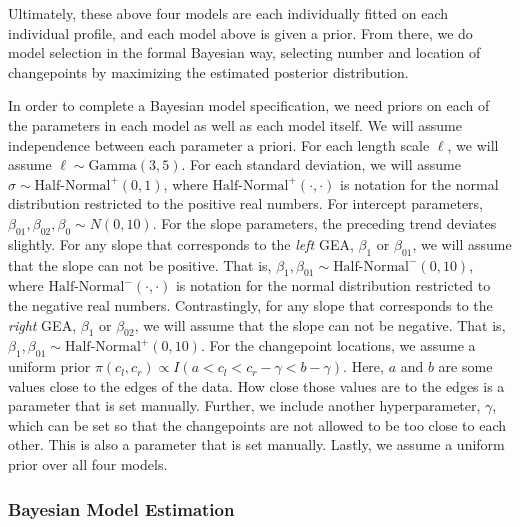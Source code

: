 \documentclass[12pt]{article}
\begin{document}
Ultimately, these above four models are each individually fitted on each
individual profile, and each model above is given a prior. From there,
we do model selection in the formal Bayesian way, selecting number and
location of changepoints by maximizing the estimated posterior
distribution.

In order to complete a Bayesian model specification, we need priors on
each of the parameters in each model as well as each model itself. We
will assume independence between each parameter a priori. For each
length scale \(\ell\), we will assume \(\ell \sim \text{Gamma}(3,5)\).
For each standard deviation, we will assume
\(\sigma \sim \text{Half-Normal}^{+}(0,1)\), where
\(\text{Half-Normal}^{+}(\cdot,\cdot)\) is notation for the normal
distribution restricted to the positive real numbers. For intercept
parameters, \(\beta_{01}, \beta_{02}, \beta_0 \sim N(0, 10)\). For the
slope parameters, the preceding trend deviates slightly. For any slope
that corresponds to the \emph{left} GEA, \(\beta_1\) or \(\beta_{01}\),
we will assume that the slope can not be positive. That is,
\(\beta_1, \beta_{01} \sim \text{Half-Normal}^{-}(0,10)\), where
\(\text{Half-Normal}^{-}(\cdot, \cdot)\) is notation for the normal
distribution restricted to the negative real numbers. Contrastingly, for
any slope that corresponds to the \emph{right} GEA, \(\beta_1\) or
\(\beta_{02}\), we will assume that the slope can not be negative. That
is, \(\beta_1, \beta_{01} \sim \text{Half-Normal}^{+}(0,10)\). For the
changepoint locations, we assume a uniform prior
\(\pi(c_l, c_r) \propto I(a < c_l < c_r - \gamma < b - \gamma)\). Here,
\(a\) and \(b\) are some values close to the edges of the data. How
close those values are to the edges is a parameter that is set manually.
Further, we include another hyperparameter, \(\gamma\), which can be set
so that the changepoints are not allowed to be too close to each other.
This is also a parameter that is set manually. Lastly, we assume a
uniform prior over all four models.

\subsubsection{Bayesian Model Estimation}
\end{document}
